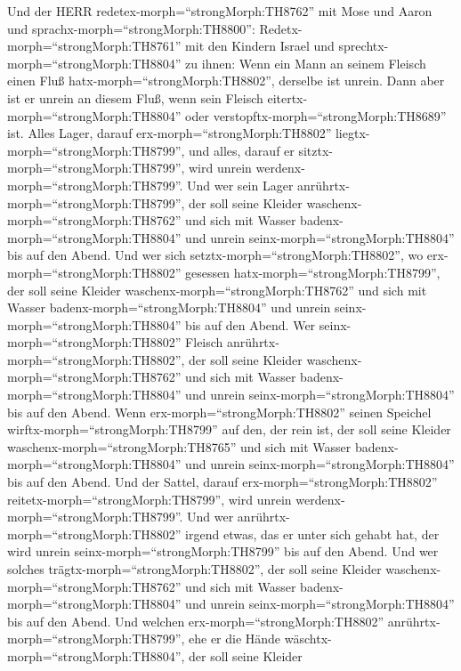  Und der HERR redetex-morph=``strongMorph:TH8762'' mit Mose
und Aaron und sprachx-morph=``strongMorph:TH8800'': 
Redetx-morph=``strongMorph:TH8761'' mit den Kindern Israel und
sprechtx-morph=``strongMorph:TH8804'' zu ihnen: Wenn ein Mann an seinem
Fleisch einen Fluß hatx-morph=``strongMorph:TH8802'', derselbe ist
unrein.  Dann aber ist er unrein an diesem Fluß, wenn sein
Fleisch eitertx-morph=``strongMorph:TH8804'' oder
verstopftx-morph=``strongMorph:TH8689'' ist.  Alles Lager,
darauf erx-morph=``strongMorph:TH8802''
liegtx-morph=``strongMorph:TH8799'', und alles, darauf er
sitztx-morph=``strongMorph:TH8799'', wird unrein
werdenx-morph=``strongMorph:TH8799''.  Und wer sein Lager
anrührtx-morph=``strongMorph:TH8799'', der soll seine Kleider
waschenx-morph=``strongMorph:TH8762'' und sich mit Wasser
badenx-morph=``strongMorph:TH8804'' und unrein
seinx-morph=``strongMorph:TH8804'' bis auf den Abend.  Und
wer sich setztx-morph=``strongMorph:TH8802'', wo
erx-morph=``strongMorph:TH8802'' gesessen
hatx-morph=``strongMorph:TH8799'', der soll seine Kleider
waschenx-morph=``strongMorph:TH8762'' und sich mit Wasser
badenx-morph=``strongMorph:TH8804'' und unrein
seinx-morph=``strongMorph:TH8804'' bis auf den Abend.  Wer
seinx-morph=``strongMorph:TH8802'' Fleisch
anrührtx-morph=``strongMorph:TH8802'', der soll seine Kleider
waschenx-morph=``strongMorph:TH8762'' und sich mit Wasser
badenx-morph=``strongMorph:TH8804'' und unrein
seinx-morph=``strongMorph:TH8804'' bis auf den Abend.  Wenn
erx-morph=``strongMorph:TH8802'' seinen Speichel
wirftx-morph=``strongMorph:TH8799'' auf den, der rein ist, der soll
seine Kleider waschenx-morph=``strongMorph:TH8765'' und sich mit Wasser
badenx-morph=``strongMorph:TH8804'' und unrein
seinx-morph=``strongMorph:TH8804'' bis auf den Abend.  Und
der Sattel, darauf erx-morph=``strongMorph:TH8802''
reitetx-morph=``strongMorph:TH8799'', wird unrein
werdenx-morph=``strongMorph:TH8799''.  Und wer
anrührtx-morph=``strongMorph:TH8802'' irgend etwas, das er unter sich
gehabt hat, der wird unrein seinx-morph=``strongMorph:TH8799'' bis auf
den Abend. Und wer solches trägtx-morph=``strongMorph:TH8802'', der soll
seine Kleider waschenx-morph=``strongMorph:TH8762'' und sich mit Wasser
badenx-morph=``strongMorph:TH8804'' und unrein
seinx-morph=``strongMorph:TH8804'' bis auf den Abend.  Und
welchen erx-morph=``strongMorph:TH8802''
anrührtx-morph=``strongMorph:TH8799'', ehe er die Hände
wäschtx-morph=``strongMorph:TH8804'', der soll seine Kleider
